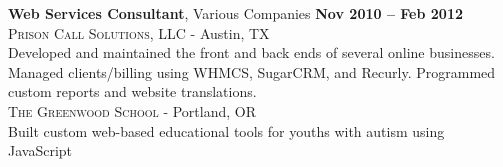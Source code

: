 \documentclass[margin,line]{resume}
\begin{document}
\begin{resume}
\textbf{Web Services Consultant}, Various Companies \hfill \textbf{Nov 2010 -- Feb 2012}\vspace{2mm}\\
\textsc{Prison Call Solutions, LLC} - Austin, TX\vspace{1mm}\\%
Developed and maintained the front and back ends of several online businesses. Managed clients/billing using WHMCS, SugarCRM, and Recurly. Programmed custom reports and website translations.
\vspace{2mm}\\
\textsc{The Greenwood School} - Portland, OR\vspace{1mm}\\%
Built custom web-based educational tools for youths with autism using JavaScript

\end{resume}
\end{document}
